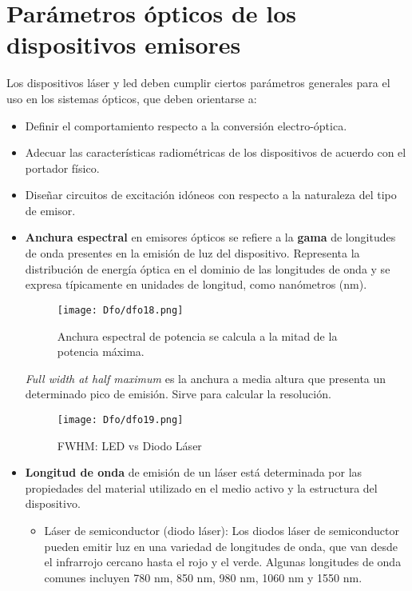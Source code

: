 \documentclass[12pt,fleqn,a4paper,oneside]{LegrandOrangeBook}
\begin{document}
\section{Parámetros ópticos de los dispositivos emisores}
Los dispositivos láser y led deben cumplir ciertos parámetros generales para el uso en los sistemas ópticos, que deben orientarse a:
\begin{itemize}
\item Definir el comportamiento respecto a la conversión electro-óptica.
\item Adecuar las características radiométricas de los dispositivos de acuerdo con el portador físico.
\item Diseñar circuitos de excitación idóneos con respecto a la naturaleza del tipo de emisor.
\end{itemize}
\begin{itemize}
\item \textbf{Anchura espectral} en emisores ópticos se refiere a la \textbf{gama} de longitudes de onda presentes en la emisión de luz del dispositivo. Representa la distribución de energía óptica en el dominio de las longitudes de onda y se expresa típicamente en unidades de longitud, como nanómetros (nm).

\begin{figure}[H]
\centering
\texttt{[image: Dfo/dfo18.png]}
\caption{Anchura espectral de potencia se calcula a la mitad de la potencia máxima.}
\end{figure}
\begin{vocabulary}[FWHM]
\textit{Full width at half maximum} es la anchura a media altura que presenta un determinado pico de emisión. Sirve para calcular la resolución.
\end{vocabulary}
\begin{figure}[H]
\centering
\texttt{[image: Dfo/dfo19.png]}
\caption{FWHM: LED vs Diodo Láser}
\end{figure}
\item \textbf{Longitud de onda} de emisión de un láser está determinada por las propiedades del material utilizado en el medio activo y la estructura del dispositivo.
\begin{itemize}
\item Láser de semiconductor (diodo láser): Los diodos láser de semiconductor pueden emitir luz en una variedad de longitudes de onda, que van desde el infrarrojo cercano hasta el rojo y el verde. Algunas longitudes de onda comunes incluyen 780 nm, 850 nm, 980 nm, 1060 nm y 1550 nm.


\end{itemize}
\end{itemize}
\end{document}
